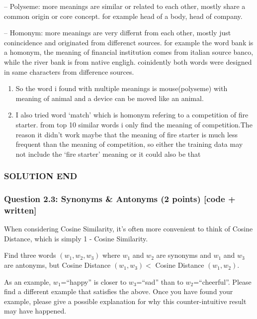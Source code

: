 \documentclass[11pt]{article}
\providecommand{\tightlist}{%
      \setlength{\itemsep}{0pt}\setlength{\parskip}{0pt}}
\begin{document}
-- Polyseme: more meanings are similar or related to each other, mostly
share a common origin or core concept. for example head of a body, head
of company.

-- Homonym: more meanings are very differnt from each other, mostly just
conincidence and originated from differenct sources. for example the
word bank is a homonym, the meaning of financial institution comes from
italian source banco, while the river bank is from native engligh.
coinidently both words were designed in same characters from difference
sources.

\begin{enumerate}
\def\labelenumi{\arabic{enumi})}
\tightlist
\item
  So the word i found with multiple meanings is mouse(polyseme) with
  meaning of animal and a device can be moved like an animal.
\item
  I also tried word `match' which is homonym refering to a competition
  of fire starter. from top 10 similar words i only find the meaning of
  competition.The reason it didn't work maybe that the meaning of fire
  starter is much less frequent than the meaning of competition, so
  either the training data may not include the `fire starter' meaning or
  it could also be that
\end{enumerate}

\subsubsection{SOLUTION END}\label{solution-end}

    \subsubsection{Question 2.3: Synonyms \& Antonyms (2 points) {[}code +
written{]}}\label{question-2.3-synonyms-antonyms-2-points-code-written}

When considering Cosine Similarity, it's often more convenient to think
of Cosine Distance, which is simply 1 - Cosine Similarity.

Find three words \((w_1,w_2,w_3)\) where \(w_1\) and \(w_2\) are
synonyms and \(w_1\) and \(w_3\) are antonyms, but Cosine Distance
\((w_1,w_3) <\) Cosine Distance \((w_1,w_2)\).

As an example, \(w_1\)=``happy'' is closer to \(w_3\)=``sad'' than to
\(w_2\)=``cheerful''. Please find a different example that satisfies the
above. Once you have found your example, please give a possible
explanation for why this counter-intuitive result may have happened.
\end{document}
